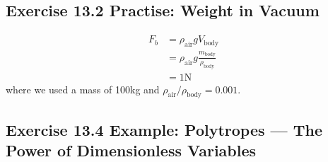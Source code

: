\documentclass[../main.tex]{subfiles}
\begin{document}
\subsection{Exercise 13.2 Practise: Weight in Vacuum}
\begin{align}
    F_{b}&=\rho_\text{air}gV_\text{body}\\
    &=\rho_\text{air}g\frac{m_\text{body}}{\rho_\text{body}}\\
    &=1\text{N}
\end{align}
where we used a mass of 100kg and $\rho_\text{air}/\rho_\text{body}=0.001$.

\subsection{Exercise 13.4 Example: Polytropes — The Power of Dimensionless Variables}
\end{document}
